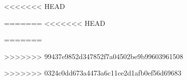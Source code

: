 <<<<<<< HEAD
\usepackage[pages=some]{background}
=======
<<<<<<< HEAD
\usepackage[pages=some]{background}
=======

>>>>>>> 99437e9852d347852f7a04502be9b99603961508
\usepackage[fontsize=9.5pt]{fontsize}
>>>>>>> 0324c0dd673a4473a6c11ce2d1afb0ef56d69683


\setlength{\itemsep}{1pt}
\setlength{\parskip}{0pt}
\setlength{\parsep}{0pt}
\setlength{\labelsep}{0pt}
\setlength{\topsep}{0pt}
\setlength{\parsep}{0pt}
\setlength{\partopsep}{0pt}